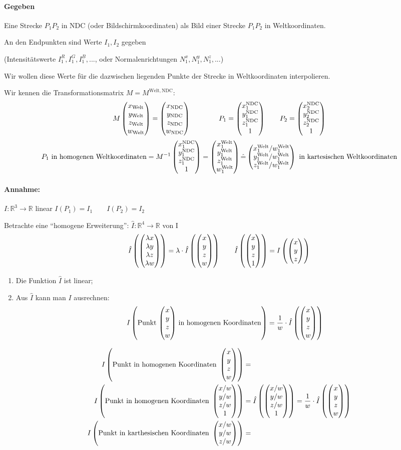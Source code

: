 \paragraph{Gegeben} Eine Strecke $P_1P_2$ in NDC (oder Bildschirmkoordinaten) als Bild einer Strecke $P_1P_2$
	in Weltkoordinaten.

	An den Endpunkten sind Werte $I_1, I_2$ gegeben

	(Intensitätswerte $I_1^R, I_1^G, I_1^B,...$, oder
	Normalenrichtungen $N_1^x, N_1^y, N_1^z,...$)

	Wir wollen diese Werte für die dazwischen liegenden Punkte der Strecke in Weltkoordinaten interpolieren.

	\hrulefill

	Wir kennen die Transformationsmatrix $M = M^{\mathrm{Welt, NDC}}$:
	\[ M \begin{pmatrix}x_{\mathrm{Welt}}\\y_{\mathrm{Welt}}\\z_{\mathrm{Welt}}\\w_{\mathrm{Welt}}\end{pmatrix}
		= \begin{pmatrix}x_{\mathrm{NDC}}\\y_{\mathrm{NDC}}\\z_{\mathrm{NDC}}\\w_{\mathrm{NDC}}\end{pmatrix}
	\qquad\qquad P_1 = \begin{pmatrix}x_1^{\mathrm{NDC}}\\y_1^{\mathrm{NDC}}\\z_1^{\mathrm{NDC}}\\1\end{pmatrix}
	\qquad P_2 = \begin{pmatrix}x_2^{\mathrm{NDC}}\\y_2^{\mathrm{NDC}}\\z_2^{\mathrm{NDC}}\\1\end{pmatrix}\]
	\[P_1\text{ in homogenen Weltkoordinaten} = M^{-1} \begin{pmatrix}x_1^{\mathrm{NDC}}\\y_1^{\mathrm{NDC}}\\z_1^{\mathrm{NDC}}\\1\end{pmatrix}
	 = \begin{pmatrix}x_1^{\mathrm{Welt}}\\y_1^{\mathrm{Welt}}\\z_1^{\mathrm{Welt}}\\w_1^{\mathrm{Welt}}\end{pmatrix}
	 \hat = \begin{pmatrix}x_1^{\mathrm{Welt}}/w_1^{\mathrm{Welt}}\\y_1^{\mathrm{Welt}}/w_1^{\mathrm{Welt}}\\z_1^{\mathrm{Welt}}/w_1^{\mathrm{Welt}}\end{pmatrix}\text{ in kartesischen Weltkoordinaten}
	\]
\paragraph{Annahme:} $I: \mathbb{R}^3 \to \mathbb{R}$ linear $I(P_1) = I_1 \qquad I(P_2) = I_2$

\hrulefill

Betrachte eine "`homogene Erweiterung"': $\hat I: \mathbb{R}^4 \to \mathbb{R}$ von I
\[\hat I\left(\begin{pmatrix}\lambda x\\\lambda y\\\lambda z\\\lambda w\end{pmatrix}\right) =
	\lambda \cdot \hat I\left(\begin{pmatrix}x\\y\\z\\w\end{pmatrix}\right)
	\qquad
	\hat I\left(\begin{pmatrix}x\\y\\z\\1\end{pmatrix}\right) = I\left(\begin{pmatrix}x\\y\\z\end{pmatrix}\right)\]
\begin{enumerate}
 \item Die Funktion $\hat I$ ist linear;
 \item Aus $\hat I$ kann man $I$ ausrechnen:
	\[I\left(\text{Punkt $\begin{pmatrix}x\\y\\z\\w\end{pmatrix}$ in homogenen Koordinaten}\right) = \frac{1}{w} \cdot
		\hat I\left(\begin{pmatrix}x\\y\\z\\w\end{pmatrix}\right)\]
\end{enumerate}
\begin{align*}
 I\left(\text{Punkt in homogenen Koordinaten }\begin{pmatrix}x\\y\\z\\w\end{pmatrix}\right) &= \\
 I\left(\text{Punkt in homogenen Koordinaten }\begin{pmatrix}x/w\\y/w\\z/w\\1\end{pmatrix}\right) &=
	\hat I \left(\begin{pmatrix}x/w\\y/w\\z/w\\1\end{pmatrix}\right) = \frac{1}{w} \cdot \hat I\left(\begin{pmatrix}x\\y\\z\\w\end{pmatrix}\right)\\
 I\left(\text{Punkt in karthesischen Koordinaten }\begin{pmatrix}x/w\\y/w\\z/w\end{pmatrix}\right) &=
\end{align*}

